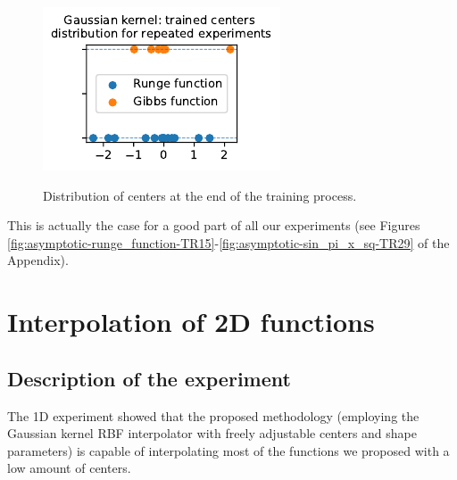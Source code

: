 \documentclass[12pt]{report} %
\begin{document}
\begin{figure}
  \caption{Distribution of centers at the end of the training
    process.\label{fig-centers-end}}
  {\includegraphics[width=\textwidth]{imagenes/experiments/1d/re_testing/reproducibility_centers.pdf}}
\end{figure}

\newpage


 This is actually the case for a good part of all our experiments (see Figures \ref{fig:asymptotic-runge_function-TR15}-\ref{fig:asymptotic-sin_pi_x_sq-TR29} of the Appendix).











\section{Interpolation of 2D functions}
\label{section:interpolation-of-franke}

\subsection*{Description of the experiment}

The 1D experiment showed that the proposed methodology (employing the Gaussian
kernel RBF interpolator with freely adjustable centers and shape parameters) is
capable of interpolating most of the functions we proposed with a low amount of
centers.

\end{document}
